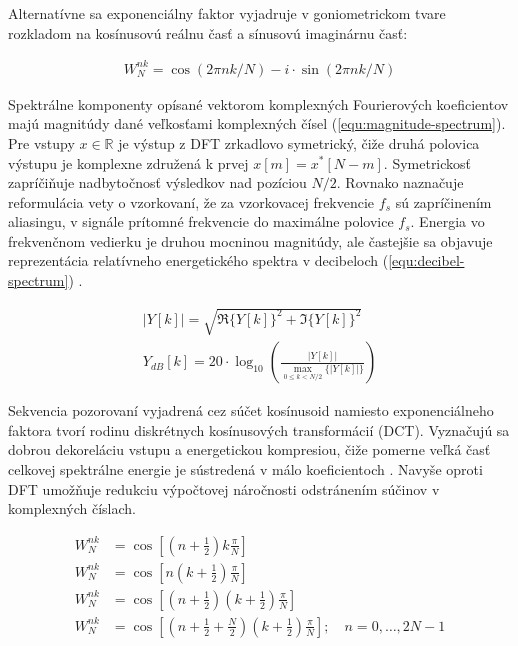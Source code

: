Alternatívne sa exponenciálny faktor vyjadruje v goniometrickom tvare rozkladom na kosínusovú reálnu časť a sínusovú imaginárnu časť:
\begin{ceqn}\begin{align}
W_{N}^{nk} = \cos(2\pi nk/ N) - i \cdot \sin(2\pi nk/ N)
\end{align}\end{ceqn}

Spektrálne komponenty opísané vektorom komplexných Fourierových koeficientov majú magnitúdy dané veľkosťami komplexných čísel
(\ref{equ:magnitude-spectrum}). Pre vstupy $x \in \mathbb{R}$ je výstup z DFT zrkadlovo symetrický, čiže druhá polovica
výstupu je komplexne združená k prvej $x[m] = x^{*}[N - m]$. Symetrickosť zapríčiňuje nadbytočnosť výsledkov
nad pozíciou  $N/2$. Rovnako naznačuje reformulácia vety o vzorkovaní, že za vzorkovacej frekvencie $f_s$ sú zapríčinením aliasingu, v signále prítomné frekvencie do maximálne polovice $f_s$. Energia vo frekvenčnom vedierku je druhou mocninou magnitúdy, ale častejšie sa
objavuje reprezentácia relatívneho energetického spektra v decibeloch (\ref{equ:decibel-spectrum}) \cite{understanding-dsp}.
\begin{ceqn}\begin{align}
|Y[k]| = \sqrt{\Re\{Y[k]\}^2 + \Im\{Y[k]\}^2} \label{equ:magnitude-spectrum} \\
Y_{dB}[k] = 20 \cdot \log_{10}{ \left( \frac{|Y[k]|}{\max\limits_{0 \leq k < N / 2}\{|Y[k]|\}} \right)} \label{equ:decibel-spectrum}
\end{align}\end{ceqn}

Sekvencia pozorovaní vyjadrená cez súčet kosínusoid namiesto exponenciálneho faktora tvorí rodinu diskrétnych
kosínusových transformácií (DCT). Vyznačujú sa dobrou dekoreláciu vstupu a energetickou kompresiou, čiže pomerne veľká
časť celkovej spektrálne energie je sústredená v málo koeficientoch \cite{dct-applications}. Navyše oproti DFT umožňuje redukciu
výpočtovej náročnosti odstránením súčinov v komplexných číslach.

\begin{ceqn}\begin{align}
\tag{DCT-II} W_{N}^{nk} &= \cos{\left[\left(n + \frac{1}{2}\right) k\frac{\pi}{N}\right]} \\
\tag{DCT-III} W_{N}^{nk} &= \cos{\left[n \left(k + \frac{1}{2} \right) \frac{\pi}{N}\right]}  \\
\tag{DCT-IV} W_{N}^{nk} &= \cos{\left[\left(n + \frac{1}{2} \right) \left(k + \frac{1}{2} \right) \frac{\pi}{N} \right]} \\
\tag{MDCT} W_{N}^{nk} &= \cos{\left[\left(n + \frac{1}{2} + \frac{N}{2} \right) \left(k + \frac{1}{2} \right) \frac{\pi}{N} \right]};\quad n = 0, \dots, 2N - 1
\end{align}\end{ceqn}

